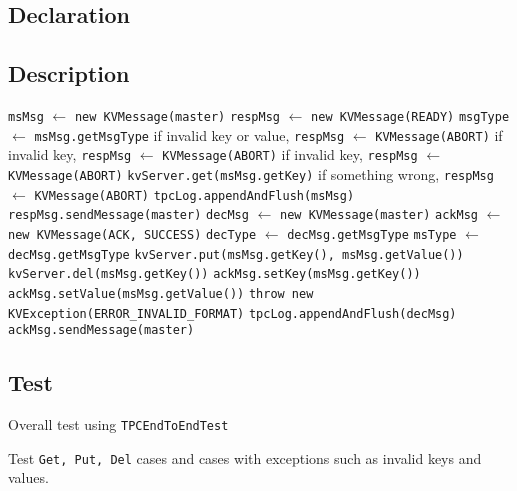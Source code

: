 \documentclass{article}
\begin{document}
\subsection{Declaration}
\subsection{Description}
\begin{bframe}
	\begin{algorithmic}
			\State \texttt{msMsg} $\leftarrow$ \texttt{new KVMessage(master)}
			\State \texttt{respMsg} $\leftarrow$ \texttt{new KVMessage(READY)}
			\State \texttt{msgType} $\leftarrow$ \texttt{msMsg.getMsgType}
				\State if invalid key or value, \texttt{respMsg} $\leftarrow$ \texttt{KVMessage(ABORT)}
				\State if invalid key, \texttt{respMsg} $\leftarrow$ \texttt{KVMessage(ABORT)}
				\State if invalid key, \texttt{respMsg} $\leftarrow$ \texttt{KVMessage(ABORT)}
				\State \texttt{kvServer.get(msMsg.getKey)}
				\State if something wrong, \texttt{respMsg} $\leftarrow$ \texttt{KVMessage(ABORT)}
			\EndIf
			\State \texttt{tpcLog.appendAndFlush(msMsg)}
			\State \texttt{respMsg.sendMessage(master)}
			\State
			\State \texttt{decMsg} $\leftarrow$ \texttt{new KVMessage(master)}
			\State \texttt{ackMsg} $\leftarrow$ \texttt{new KVMessage(ACK, SUCCESS)}
			\State \texttt{decType} $\leftarrow$ \texttt{decMsg.getMsgType}
			\State \texttt{msType} $\leftarrow$ \texttt{decMsg.getMsgType}
					\State \texttt{kvServer.put(msMsg.getKey(), msMsg.getValue())}
					\State \texttt{kvServer.del(msMsg.getKey())}
					\State \texttt{ackMsg.setKey(msMsg.getKey())}
					\State \texttt{ackMsg.setValue(msMsg.getValue())}
				\EndIf
			\Else
				\State \texttt{throw new KVException(ERROR\_INVALID\_FORMAT)}
			\EndIf
			\State \texttt{tpcLog.appendAndFlush(decMsg)}
			\State \texttt{ackMsg.sendMessage(master)}
		\EndProcedure
	\end{algorithmic}
\end{bframe}
\subsection{Test}
\begin{compactitem}
	\item Overall test using \texttt{TPCEndToEndTest}
	\item Test \texttt{Get, Put, Del} cases and cases with exceptions such as invalid keys and values.
\end{compactitem}
\end{document}
